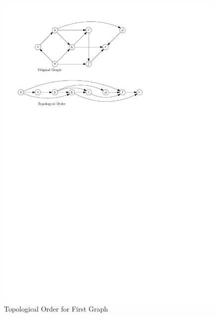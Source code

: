 \begin{homeworkProblem}
\begin{homeworkSubProblem}
    \begin{figure}[H]
        \caption{Topological Order for First Graph}\label{2.a}
        \centering
        \includegraphics[width=.8\textwidth]{running2a}
    \end{figure}


\end{homeworkSubProblem}
\end{homeworkProblem}
